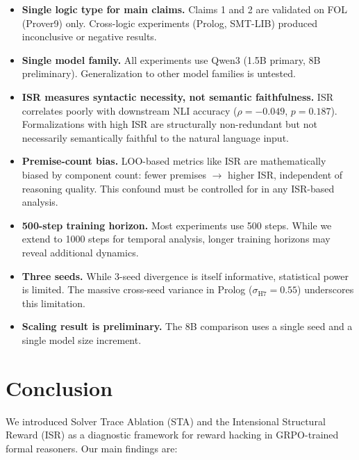 \documentclass[11pt,a4paper]{article}
\newcommand{\ISR}{\textsc{ISR}}
\newcommand{\STA}{\textsc{STA}}
\newcommand{\GRPO}{\textsc{GRPO}}
\begin{document}
\begin{itemize}
\item \textbf{Single logic type for main claims.} Claims 1 and 2 are validated on FOL (Prover9) only. Cross-logic experiments (Prolog, SMT-LIB) produced inconclusive or negative results.
\item \textbf{Single model family.} All experiments use Qwen3 (1.5B primary, 8B preliminary). Generalization to other model families is untested.
\item \textbf{\ISR{} measures syntactic necessity, not semantic faithfulness.} \ISR{} correlates poorly with downstream NLI accuracy ($\rho = -0.049$, $p=0.187$). Formalizations with high \ISR{} are structurally non-redundant but not necessarily semantically faithful to the natural language input.
\item \textbf{Premise-count bias.} LOO-based metrics like \ISR{} are mathematically biased by component count: fewer premises $\to$ higher \ISR{}, independent of reasoning quality. This confound must be controlled for in any ISR-based analysis.
\item \textbf{500-step training horizon.} Most experiments use 500 steps. While we extend to 1000 steps for temporal analysis, longer training horizons may reveal additional dynamics.
\item \textbf{Three seeds.} While 3-seed divergence is itself informative, statistical power is limited. The massive cross-seed variance in Prolog ($\sigma_{\text{H7}}=0.55$) underscores this limitation.
\item \textbf{Scaling result is preliminary.} The 8B comparison uses a single seed and a single model size increment.
\end{itemize}

\section{Conclusion}

We introduced Solver Trace Ablation (\STA{}) and the Intensional Structural Reward (\ISR{}) as a diagnostic framework for reward hacking in \GRPO{}-trained formal reasoners. Our main findings are:
\end{document}
